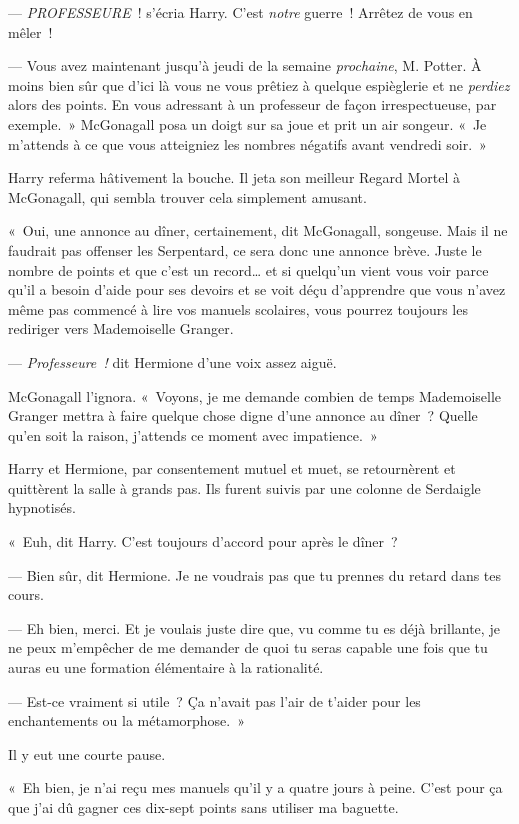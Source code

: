 --- \emph{PROFESSEURE}~! s'écria Harry. C'est \emph{notre} guerre~! Arrêtez de vous en mêler~!

--- Vous avez maintenant jusqu'à jeudi de la semaine \emph{prochaine}, M. Potter.
À moins bien sûr que d'ici là vous ne vous prêtiez à quelque espièglerie et ne \emph{perdiez} alors des points.
En vous adressant à un professeur de façon irrespectueuse, par exemple.~»
McGonagall posa un doigt sur sa joue et prit un air songeur.
«~Je m'attends à ce que vous atteigniez les nombres négatifs avant vendredi soir.~»

Harry referma hâtivement la bouche.
Il jeta son meilleur Regard Mortel à McGonagall, qui sembla trouver cela simplement amusant.

«~Oui, une annonce au dîner, certainement, dit McGonagall, songeuse.
Mais il ne faudrait pas offenser les Serpentard, ce sera donc une annonce brève.
Juste le nombre de points et que c'est un record… et si quelqu'un vient vous voir parce qu'il a besoin d'aide pour ses devoirs et se voit déçu d'apprendre que vous n'avez même pas commencé à lire vos manuels scolaires, vous pourrez toujours les rediriger vers Mademoiselle Granger.

--- \emph{Professeure~!} dit Hermione d'une voix assez aiguë.

McGonagall l'ignora.
«~Voyons, je me demande combien de temps Mademoiselle Granger mettra à faire quelque chose digne d'une annonce au dîner~?
Quelle qu'en soit la raison, j'attends ce moment avec impatience.~»

Harry et Hermione, par consentement mutuel et muet, se retournèrent et quittèrent la salle à grands pas.
Ils furent suivis par une colonne de Serdaigle hypnotisés.

«~Euh, dit Harry. C'est toujours d'accord pour après le dîner~?

--- Bien sûr, dit Hermione. Je ne voudrais pas que tu prennes du retard dans tes cours.

--- Eh bien, merci. Et je voulais juste dire que, vu comme tu es déjà brillante, je ne peux m'empêcher de me demander de quoi tu seras capable une fois que tu auras eu une formation élémentaire à la rationalité.

--- Est-ce vraiment si utile~?
Ça n'avait pas l'air de t'aider pour les enchantements ou la métamorphose.~»

Il y eut une courte pause.

«~Eh bien, je n'ai reçu mes manuels qu'il y a quatre jours à peine.
C'est pour ça que j'ai dû gagner ces dix-sept points sans utiliser ma baguette.

